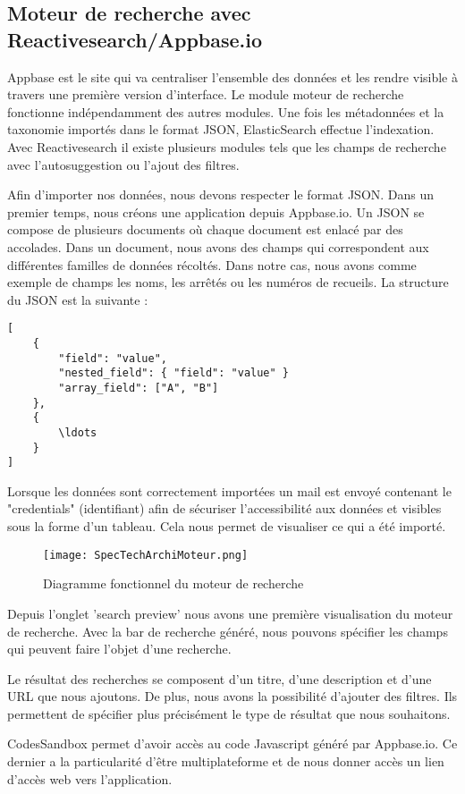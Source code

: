 \subsection{Moteur de recherche avec Reactivesearch/Appbase.io}
Appbase est le site qui va centraliser l'ensemble des données et les rendre visible à travers une première version d'interface.
Le module moteur de recherche fonctionne indépendamment des autres modules. Une fois les métadonnées et la taxonomie importés dans le format JSON, ElasticSearch effectue l'indexation. Avec Reactivesearch il existe plusieurs modules tels que les champs de recherche avec l'autosuggestion ou l'ajout des filtres.  

Afin d'importer nos données, nous devons respecter le format JSON\@.
Dans un premier temps, nous créons une application depuis Appbase.io. 
Un JSON se compose de plusieurs documents où chaque document est enlacé par des accolades. Dans un document, nous avons des champs qui correspondent aux différentes familles de données récoltés. Dans notre cas, nous avons comme exemple de champs les noms, les arrêtés ou les numéros de recueils. La structure du JSON est la suivante :

\begin{lstlisting}
[
	{
		"field": "value",
		"nested_field": { "field": "value" }
		"array_field": ["A", "B"]
	},
	{
		\ldots
	}
]
\end{lstlisting}

Lorsque les données sont correctement importées un mail est envoyé contenant le "credentials" (identifiant) afin de sécuriser l'accessibilité aux données et visibles sous la forme d'un tableau. Cela nous permet de visualiser ce qui a été importé. 

\begin{figure}[h!]
  \centering
	\texttt{[image: SpecTechArchiMoteur.png]}
	\caption[]{Diagramme fonctionnel du moteur de recherche}
  \label{}
\end{figure}

Depuis l'onglet 'search preview' nous avons une première visualisation du moteur de recherche. Avec la bar de recherche généré, nous pouvons spécifier les champs qui peuvent faire l'objet d'une recherche. 

Le résultat des recherches se composent d’un titre, d’une description et d’une URL que nous ajoutons. De plus, nous avons la possibilité d’ajouter des filtres. Ils permettent de spécifier plus précisément le type de résultat que nous souhaitons.

CodesSandbox permet d’avoir accès au code Javascript généré par Appbase.io. Ce dernier a la particularité d’être multiplateforme et de nous donner accès un lien d’accès web vers l'application.
